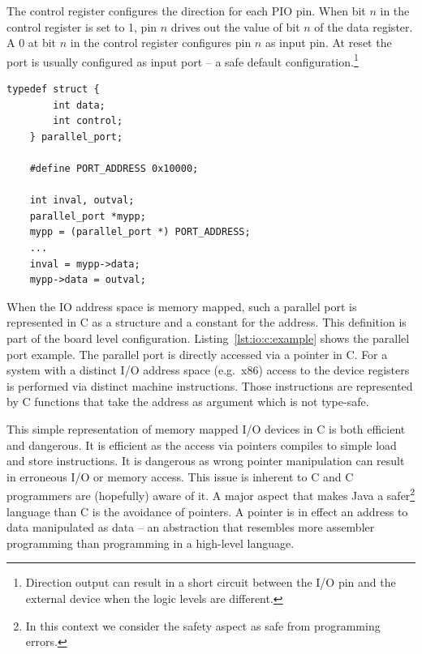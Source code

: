 The control register configures the direction for each PIO pin. When
bit $n$ in the control register is set to 1, pin $n$ drives out the
value of bit $n$ of the data register. A 0 at bit $n$ in the control
register configures pin $n$ as input pin. At reset the port is
usually configured as input port -- a safe default
configuration.\footnote{Direction output can result in a short
circuit between the I/O pin and the external device when the logic
levels are different.}

\begin{lstlisting}[float=t,caption={Definition and usage of a parallel port in C},
label=lst:io:c:example]
    typedef struct {
        int data;
        int control;
    } parallel_port;

    #define PORT_ADDRESS 0x10000;

    int inval, outval;
    parallel_port *mypp;
    mypp = (parallel_port *) PORT_ADDRESS;
    ...
    inval = mypp->data;
    mypp->data = outval;
\end{lstlisting}

When the IO address space is memory mapped, such a parallel port is
represented in C as a structure and a constant for the address. This
definition is part of the board level configuration.
Listing~\ref{lst:io:c:example} shows the parallel port example. The
parallel port is directly accessed via a pointer in C. For a system
with a distinct I/O address space (e.g.\ x86) access to the device
registers is performed via distinct machine instructions. Those
instructions are represented by C functions that take the address as
argument which is not type-safe.

This simple representation of memory mapped I/O devices in C is both
efficient and dangerous. It is efficient as the access via pointers
compiles to simple load and store instructions. It is dangerous as
wrong pointer manipulation can result in erroneous I/O or memory
access. This issue is inherent to C and C programmers are (hopefully)
aware of it. A major aspect that makes Java a safer\footnote{In this
context we consider the safety aspect as safe from programming
errors.} language than C is the avoidance of pointers. A pointer is
in effect an address to data manipulated as data -- an abstraction
that resembles more assembler programming than programming in a
high-level language.

